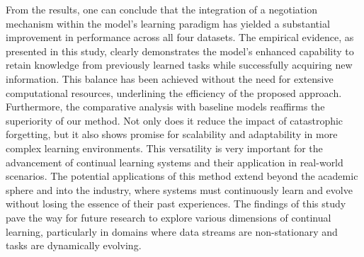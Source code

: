 \documentclass{article}
\begin{document}
 From the results, one can conclude that the integration of a negotiation mechanism within the model's learning paradigm has yielded a substantial improvement in performance across all four datasets. The empirical evidence, as presented in this study, clearly demonstrates the model's enhanced capability to retain knowledge from previously learned tasks while successfully acquiring new information. This balance has been achieved without the need for extensive computational resources, underlining the efficiency of the proposed approach.
Furthermore, the comparative analysis with baseline models reaffirms the superiority of our method. Not only does it reduce the impact of catastrophic forgetting, but it also shows promise for scalability and adaptability in more complex learning environments. This versatility is very important for the advancement of continual learning systems and their application in real-world scenarios. The potential applications of this method extend beyond the academic sphere and into the industry, where systems must continuously learn and evolve without losing the essence of their past experiences. The findings of this study pave the way for future research to explore various dimensions of continual learning, particularly in domains where data streams are non-stationary and tasks are dynamically evolving.


\end{document}
